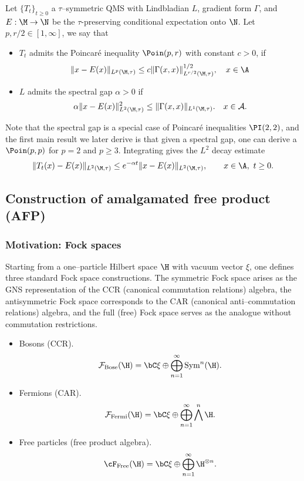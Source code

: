 \documentclass[sn-mathphys-num]{sn-jnl}
\begin{document}
\begin{definition}
Let
$\{T_t\}_{t\ge0}$ a $\tau$--symmetric QMS with Lindbladian $ L$, gradient form $\Gamma$, and $E : \M \to \N$
be the $\tau$\nobreakdash-preserving conditional expectation onto $\N$.
Let $p,r/2\in[1,\infty]$,
we say that
\begin{itemize}
    \item $T_t$ admits the Poincar\'e inequality $\Poin (p,r)$ with constant $c>0$, if
    \[
        \| x - E(x) \|_{L^p(\M,\tau)} \le c   \| \Gamma(x, x) \|^{1/2}_{L^{r/2}(\M,\tau)},\quad  x\in\A
    \]
    \item $L$ admits the spectral gap $\alpha>0$ if
\begin{equation}
\alpha\|x - E(x)\|_{L^2(\M,\tau)}^{2}\leq \|\Gamma(x,x)\|_{L^1(\M,\tau)}.
\quad
 x\in\mathcal{A}.\label{eq:gap}
\end{equation}
\end{itemize}
\end{definition}
Note that the spectral gap is a special case of Poincar\'e inequalities $\PI(2,2)$, and the first main result we later derive is that given a spectral gap, one can derive a $\Poin(p,p)$ for $p=2$ and $p\geq 3$.
Integrating  gives the $L^2$ decay estimate
\[
\|T_t(x)-E(x)\|_{L^2(\M,\tau)} \le e^{-\alpha t}\|x-E(x)\|_{L^2(\M,\tau)},\qquad x\in\A,\ t\ge0.
\]



\subsection{Construction of amalgamated free product (AFP)}\label{sec:free-product}
\subsubsection{Motivation: Fock spaces}\label{sec:phys-motivation}
Starting from a one--particle Hilbert space $\H$ with vacuum vector $\xi$, one defines three standard Fock space constructions.
The symmetric Fock space arises as the GNS representation of the CCR (canonical commutation relations) algebra, the antisymmetric Fock space corresponds to the CAR (canonical anti--commutation relations) algebra, and the full (free) Fock space serves as the analogue without commutation restrictions.

\begin{itemize}[leftmargin=*]
  \item {Bosons (CCR).}
  \[
    \mathcal F_{\mathrm{Bose}}(\H) =  \bC \xi \oplus\bigoplus_{n=1}^\infty \mathrm{Sym}^n(\H).
  \]

  \item {Fermions (CAR).}
  \[
    \mathcal F_{\mathrm{Fermi}}(\H) =  \bC \xi \oplus\bigoplus_{n=1}^\infty \bigwedge^n \H.
  \]

\item {Free particles (free product algebra).}
\begin{equation}
    \label{eq:free-fock}
      \cF_{\mathrm{Free}}(\H)
  = \bC \xi \oplus \bigoplus_{n=1}^\infty \H^{\otimes n}.
\end{equation}
\end{itemize}
\end{document}
